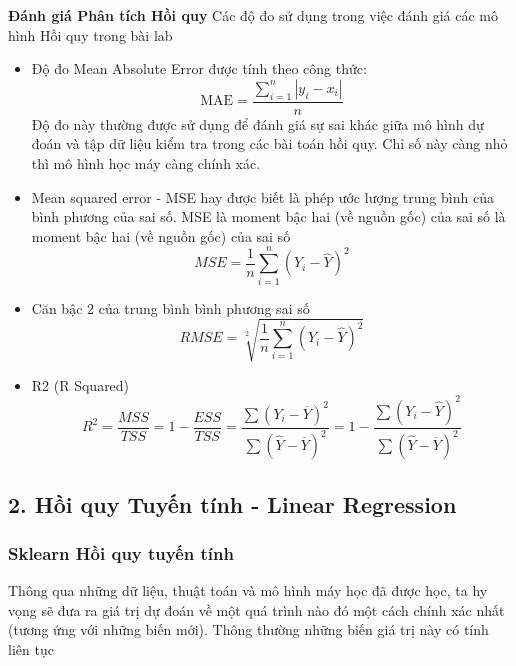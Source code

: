 \documentclass{article}
\begin{document}
	\textbf{Đánh giá Phân tích Hồi quy}
	Các độ đo sử dụng trong việc đánh giá các mô hình Hồi quy trong bài lab
	\begin{itemize}
		\item Độ đo Mean Absolute Error được tính theo công thức:
		$$\text{MAE} = \frac{\sum_{i=1}^n|y_i-x_i|}{n}$$
		Độ đo này thường được sử dụng để đánh giá sự sai khác giữa mô hình dự đoán và tập dữ liệu kiểm tra trong các bài toán hồi quy. Chỉ số này càng nhỏ thì mô hình học máy càng chính xác.
		\item Mean squared error - MSE hay được biết là phép ước lượng trung bình của bình phương của sai số. MSE là moment bậc hai (về nguồn gốc) của sai số là moment bậc hai (về nguồn gốc) của sai số
		$$MSE = \frac{1}{n}\sum_{i=1}^{n}(Y_i - \hat{Y})^2$$
		\item Căn bậc 2 của trung bình bình phương sai số
		$$RMSE = \sqrt[2]{\frac{1}{n}\sum_{i=1}^{n}(Y_i - \hat{Y})^2}$$
		\item R2 (R Squared)
		$$R^2 = \frac{MSS}{TSS} = 1 - \frac{ESS}{TSS} = \frac{\sum(Y_i - \overline{Y})^2}{\sum(\hat{Y} - \overline{Y})^2} = 1 - \frac{\sum(Y_i - \hat{Y})^2}{\sum(\hat{Y} - \overline{Y})^2}$$
	\end{itemize}
	
	
	\subsection{2. Hồi quy Tuyến tính - Linear Regression}
	\subsubsection{Sklearn Hồi quy tuyến tính}
	\qquad Thông qua những dữ liệu, thuật toán và mô hình máy học đã được học, ta hy vọng sẽ đưa ra giá trị dự đoán về một quá trình nào đó một cách chính xác nhất (tương ứng với những biến mới). Thông thường những biến giá trị này có tính liên tục
	
\end{document}
